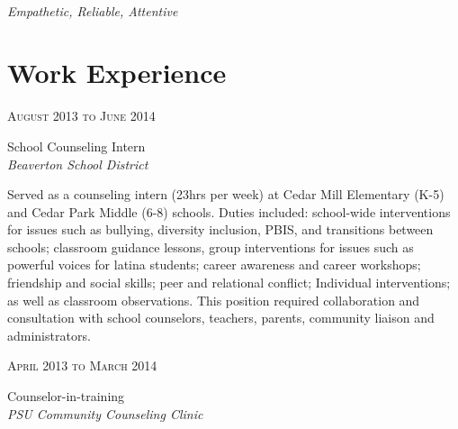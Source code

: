 \documentclass[10pt]{article} %
\begin{document}
\color{text1} %

\par{\\ %
{\color{headings} 
\textit{Empathetic, Reliable, Attentive}
 \\[15pt]\par} %
	

\begin{minipage}[t]{0.5\textwidth} %
\vspace{0pt} %
	
\section{Work Experience} 

{\raggedleft\textsc{August 2013 to June 2014}\par}
{\raggedright\large School Counseling Intern\\
\textit{Beaverton School District}\\[5pt]}

\normalsize{
Served as a counseling intern (23hrs per week) at Cedar Mill Elementary (K-5) and Cedar Park Middle (6-8) schools. Duties included: school-wide interventions for issues such as bullying, diversity inclusion, PBIS, and transitions between schools; classroom guidance lessons, group interventions for issues such as powerful voices for latina students; career awareness and career workshops; friendship and social skills; peer and relational conflict; Individual interventions; as well as classroom observations. This position required collaboration and consultation with school counselors, teachers, parents, community liaison and administrators.
}\\


{\raggedleft\textsc{April 2013 to March 2014}\par}
{\raggedright\large Counselor-in-training\\
\textit{PSU Community Counseling Clinic}\\[5pt]}


\end{minipage}}
\end{document}

